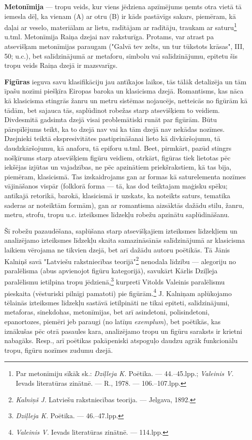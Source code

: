 \documentclass[11pt]{article}
\begin{document}
{\bf Metonīmija} --- tropu veids, kur viens jēdziena
apzīmējums ņemts otra vietā tā iemesla dēļ, ka vienam
(A) ar otru (B) ir kāds pastāvīgs sakars, piemēram, kā
daļai ar veselo, materiālam ar lietu, radītājam ar
radītāju, traukam ar saturu\footnote{Par metonīmiju
sīkāk sk.: {\em Dziļleja K.} Poētika. --- 44.--45.lpp.;
{\em Valeinis V.} Ievads literatūras zinātnē. --- R.,
1978. --- 106.--107.lpp.} u.tml.
Metonīmija Raiņa dzejai nav raksturīga.
Protams, var atrast pa atsevišķam metonīmijas paraugam
("Galvā tev zelts, un tur tūkstots krāsas", III, 50;
u.c.), bet salīdzinājumā ar metaforu, simbolu vai
salīdzinājumu, epitetu šis tropu veids Raiņa dzejā
ir mazsvarīgs.

{\bf Figūras} ieguva savu klasifikāciju jau antīkajos
laikos, tās tālāk detalizēja un tām īpašu nozīmi piešķīra
Eiropas baroka un klasicisma dzejā. Romantisms,
kas nāca kā klasicisma stingrās žanru un metru sistēmas
nojaucējs, netteicās no figūrām kā tādām, bet sajauca tās,
saplūdinot robežas starp atsevišķiem to veidiem.
Divdesmitā gadsimta dzejā visai problemātiski
runāt par figūrām. Būtu pārspīlējums teikt, ka to
dzejā nav vai ka tām dzejā nav nekādas nozīmes.
Dzejnieki teiktā ekspresivitātes pastiprināšanai
lieto kā divkāršojumu, tā daudzkāršojumu,
kā anaforu, tā epiforu u.tml. Beet,
pirmkārt, pazūd stingrs nošķīrums starp atsevišķiem
figūru veidiem, otrkārt, figūras tiek lietotas
pēc iekšējas izjūtas un vajadzības, ne pēc
apzinātiem priekšrakstiem, kā tas bija, piemēram,
klasicismā. Tas izskaidrojams gan ar formas kā
saturelementa nozīmes vājināšanos vispār (folklorā forma ---
tā, kas dod teiktajam maģisku spēku; antīkajā
retorikā, barokā, klasicismā ir uzskats, ka
noteikts saturs, tematika saderas ar noteiktām formām),
gan ar romantisma aizsāktās dažādu stilu, žanru,
metru, strofu, tropu u.c. izteiksmes līdzekļu robežu
apzinātu saplūdināšanu.

Šī robežu pazaudēšana, saplūšana starp atsevišķajiem
izteiksmes līdzekļiem un analizējamo izteiksmes līdzekļu
skaita samazināsānās salīdzinājumā ar klasicisma laikiem
vērojama ne tikvien dzejā, bet arī dažādu autoru poētikās.
Tā Jānis Kalniņš savā "Latviešu rakstniecības
teorijā"\footnote{{\em Kalniņš J.} Latviešu rakstniecības
teorija. --- Jelgava, 1892.} nenodala līdzibu ---
alegoriju no paralēlisma (abus apvienojot figūru
kategorijā), savukārt Kārlis Dziļleja paralēlismu
ietilpina tropu jēdzienā,\footnote{{\em Dziļleja K.}
Poētika. --- 46.--47.lpp.} kurpretī Vitolds Valeinis
paralēlismu pieskaita (vēsturiski pilnīgi pamatoti)
pie figūrām.\footnote{{\em Valeinis V.} Ievads
literatūras zinātnē. --- 114.lpp.} J. Kalniņam
aplūkojamo tēlainās izteiksmes līdzekļu sastāvā
ietilpināti ne tikai epiteti, salīdzinājumi,
metaforas, sinekdohas, metonīmijas, bet arī
asindetoni, polisindetoni, epanortozes, piemēri
jeb paraugi (no latīņu {\em exemplum}), bet poētikās,
kas iznākušas pēc otrā pasaules kara, analizējamo
tropu un figūru saraksts ir krietni nabagāks. Resp., arī
poētikas pakāpeniski atspoguļo daudzu agrāk
funkcionālu tropu, figūru nozīmes zudumu dzejā.
\end{document}
